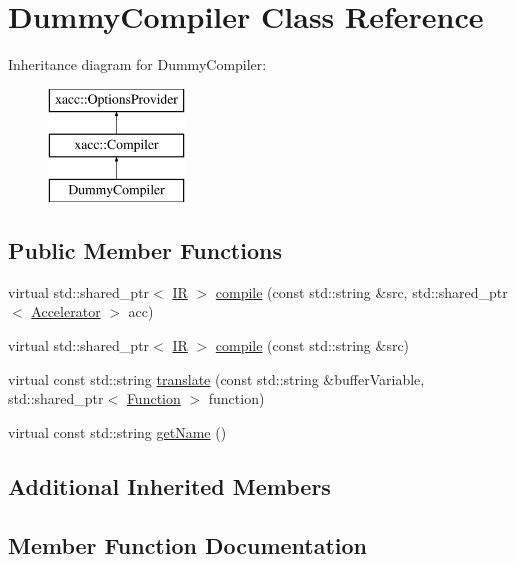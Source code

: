 \hypertarget{a00972}{}\section{Dummy\+Compiler Class Reference}
\label{a00972}
Inheritance diagram for Dummy\+Compiler\+:\begin{figure}[H]
\begin{center}
\leavevmode
\includegraphics[height=3.000000cm]{a00972}
\end{center}
\end{figure}
\subsection*{Public Member Functions}
\begin{DoxyCompactItemize}
\item 
virtual std\+::shared\+\_\+ptr$<$ \hyperlink{a01148}{IR} $>$ \hyperlink{a00972_a9eaa6e6a4ff3645915d166a325bfde8d}{compile} (const std\+::string \&src, std\+::shared\+\_\+ptr$<$ \hyperlink{a01084}{Accelerator} $>$ acc)
\item 
virtual std\+::shared\+\_\+ptr$<$ \hyperlink{a01148}{IR} $>$ \hyperlink{a00972_a2f9bb3d30bb11f12b530854a11c8fb25}{compile} (const std\+::string \&src)
\item 
virtual const std\+::string \hyperlink{a00972_a606c27150c8d374242b8824e45b1e0c1}{translate} (const std\+::string \&buffer\+Variable, std\+::shared\+\_\+ptr$<$ \hyperlink{a01124}{Function} $>$ function)
\item 
virtual const std\+::string \hyperlink{a00972_a76460cb78671dc2cf42f2bebf8fb80c7}{get\+Name} ()
\end{DoxyCompactItemize}
\subsection*{Additional Inherited Members}


\subsection{Member Function Documentation}
\mbox{\label{a00972_a9eaa6e6a4ff3645915d166a325bfde8d}} 
